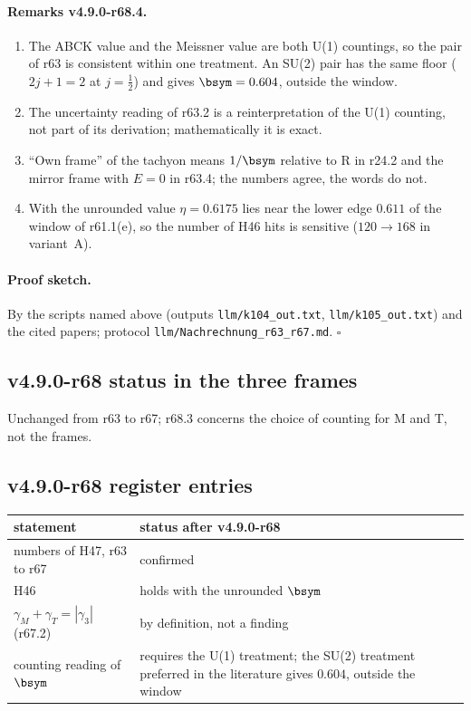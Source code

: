 \paragraph{Remarks v4.9.0-r68.4.}
\begin{enumerate}[leftmargin=2em]
\item The ABCK value and the Meissner value are both U(1) countings, so the pair of r63 is consistent within one treatment.  An SU(2) pair has the same floor
(\(2j+1=2\) at \(j=\tfrac12\)) and gives \(\bsym=0.604\), outside the window.
\item The uncertainty reading of r63.2 is a reinterpretation of the U(1) counting, not part of its derivation; mathematically it is exact.
\item ``Own frame'' of the tachyon means \(1/\bsym\) relative to R in r24.2 and the mirror frame with \(E=0\) in r63.4; the numbers agree, the words do not.
\item With the unrounded value \(\eta=0.6175\) lies near the lower edge \(0.611\) of the window of r61.1(e), so the number of H46 hits is sensitive
(\(120\to168\) in variant~A).
\end{enumerate}

\paragraph{Proof sketch.}
By the scripts named above (outputs \texttt{llm/k104\_out.txt}, \texttt{llm/k105\_out.txt}) and the cited papers; protocol \texttt{llm/Nachrechnung\_r63\_r67.md}.
\(\square\)

\subsection*{v4.9.0-r68 status in the three frames}
\label{subsec:v490-r68-frames}

Unchanged from r63 to r67; r68.3 concerns the choice of counting for M and T, not the frames.

\subsection*{v4.9.0-r68 register entries}
\label{subsec:v490-r68-register}

\begin{center}
\small
\begin{tabular}{@{}>{\raggedright\arraybackslash}p{}>{\raggedright\arraybackslash}p{}@{}}
\toprule
statement & status after v4.9.0-r68\\
\midrule
numbers of H47, r63 to r67 & confirmed\\
H46 & holds with the unrounded \(\bsym\)\\
\(\gamma_M+\gamma_T=|\gamma_3|\) (r67.2) & by definition, not a finding\\
counting reading of \(\bsym\) & requires the U(1) treatment; the SU(2) treatment preferred in the literature gives \(0.604\), outside the window\\
\bottomrule
\end{tabular}
\end{center}

